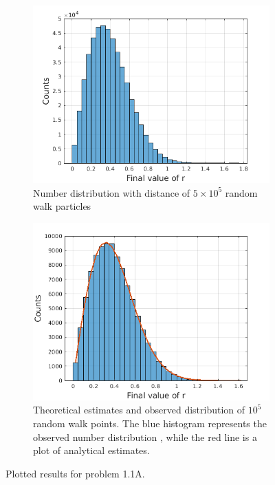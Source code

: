\documentclass[a4paper]{article}
\begin{document}
\begin{figure} [h]
			\begin{subfigure} {.475\columnwidth}
				\includegraphics[width=\columnwidth]{../plots/1ac_hist_randomwalk.png}
				\caption{Number distribution with distance of \(5 \times 10^5\) random walk particles}
				\label{fig:1c}
			\end{subfigure}%
			\hfill
			\begin{subfigure} {.475\columnwidth}
				\includegraphics[width=\columnwidth]{../plots/1ad_hist_randomwalk.png}
				\caption{Theoretical estimates and observed distribution of \(10^5\) random walk points. The blue histogram represents the observed number distribution , while the red line is a plot of analytical estimates.}
				\label{fig:1d}
			\end{subfigure}
			\caption{Plotted results for problem 1.1A.}
			\label{fig:1}
		\end{figure}
		
\end{document}
